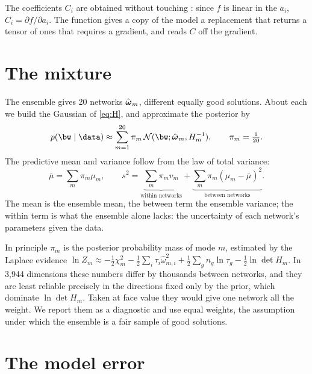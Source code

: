 The coefficients $C_i$ are obtained without touching : since $f$ is linear
in the $a_i$, $C_i = \partial f/\partial a_i$. The function 
gives a copy of the model a replacement  that returns a tensor of ones that
requires a gradient, and reads $C$ off the gradient.

\section{The mixture}
\label{sec:mixture}

The ensemble gives 20 networks $\hat{\boldsymbol{\omega}}_m$, different equally good solutions. About each we
build the Gaussian of \cref{eq:H}, and approximate the posterior by
\begin{equation}
  p(\bw\mid\data) \approx \sum_{m=1}^{20} \pi_m\, \mathcal{N}(\bw; \what_m, H_m^{-1}),
  \qquad \pi_m = \tfrac{1}{20} .
\end{equation}
The predictive mean and variance follow from the law of total variance:
\begin{equation}
  \bar\mu = \sum_m \pi_m \mu_m , \qquad
  s^2 = \underbrace{\sum_m \pi_m v_m}_{\text{within networks}}
      + \underbrace{\sum_m \pi_m (\mu_m - \bar\mu)^2}_{\text{between networks}} .
  \label{eq:mix}
\end{equation}
The mean is the ensemble mean, the between term the ensemble variance; the within term is
what the ensemble alone lacks: the uncertainty of each network's parameters given the data.

\begin{aside}
In principle $\pi_m$ is the posterior probability mass of mode $m$, estimated by the
Laplace evidence $\ln Z_m \approx -\tfrac12\chi^2_m - \tfrac12\sum_i\tau_i\hat\omega_{m,i}^2
+ \tfrac12\sum_g n_g\ln\tau_g - \tfrac12\ln\det H_m$. In 3,944 dimensions these numbers
differ by thousands between networks, and they are least reliable precisely in the
directions fixed only by the prior, which dominate $\ln\det H_m$. Taken at face value they
would give one network all the weight. We report them as a diagnostic and use equal
weights, the assumption under which the ensemble is a fair sample of good solutions.
\end{aside}

\section{The model error}


